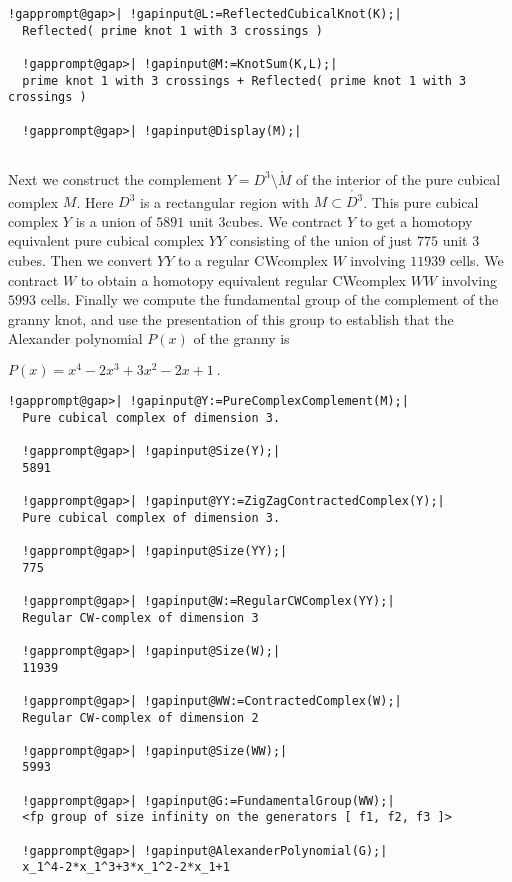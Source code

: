 \documentclass[a4paper,11pt]{report}
\begin{document}
{{\begin{Verbatim}[commandchars=!@|,fontsize=\small,frame=single,label=Example]
  !gapprompt@gap>| !gapinput@L:=ReflectedCubicalKnot(K);|
  Reflected( prime knot 1 with 3 crossings )
  
  !gapprompt@gap>| !gapinput@M:=KnotSum(K,L);|
  prime knot 1 with 3 crossings + Reflected( prime knot 1 with 3 crossings )
  
  !gapprompt@gap>| !gapinput@Display(M);|
  
\end{Verbatim}
  

 Next we construct the complement $Y=D^3\setminus \mathring{M}$ of the interior of the pure cubical complex $M$. Here $D^3$ is a rectangular region with $M \subset \mathring{D^3}$. This pure cubical complex $Y$ is a union of $5891$ unit $3$\texttt{}cubes. We contract $Y$ to get a homotopy equivalent pure cubical complex $YY$ consisting of the union of just $775$ unit $3$\texttt{}cubes. Then we convert $YY$ to a regular CW\texttt{}complex $W$ involving $11939$ cells. We contract $W$ to obtain a homotopy equivalent regular CW\texttt{}complex $WW$ involving $5993$ cells. Finally we compute the fundamental group of the complement of the
granny knot, and use the presentation of this group to establish that the
Alexander polynomial $P(x)$ of the granny is 

$P(x) = x^4-2x^3+3x^2-2x+1 \ .$ 
\begin{Verbatim}[commandchars=!@|,fontsize=\small,frame=single,label=Example]
  !gapprompt@gap>| !gapinput@Y:=PureComplexComplement(M);|
  Pure cubical complex of dimension 3.
  
  !gapprompt@gap>| !gapinput@Size(Y);|
  5891
  
  !gapprompt@gap>| !gapinput@YY:=ZigZagContractedComplex(Y);|
  Pure cubical complex of dimension 3.
  
  !gapprompt@gap>| !gapinput@Size(YY);|
  775
  
  !gapprompt@gap>| !gapinput@W:=RegularCWComplex(YY);|
  Regular CW-complex of dimension 3
  
  !gapprompt@gap>| !gapinput@Size(W);|
  11939
  
  !gapprompt@gap>| !gapinput@WW:=ContractedComplex(W);|
  Regular CW-complex of dimension 2
  
  !gapprompt@gap>| !gapinput@Size(WW);|
  5993
  
  !gapprompt@gap>| !gapinput@G:=FundamentalGroup(WW);|
  <fp group of size infinity on the generators [ f1, f2, f3 ]>
  
  !gapprompt@gap>| !gapinput@AlexanderPolynomial(G);|
  x_1^4-2*x_1^3+3*x_1^2-2*x_1+1
  

\end{Verbatim}}}
\end{document}
